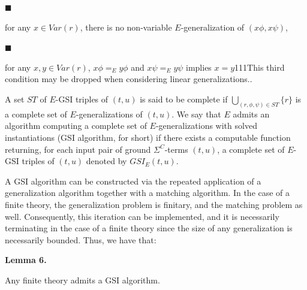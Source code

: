  
 
\par\noindent  $\blacksquare$ 
 
for any $x\in\mathit{Var}(r)$, there is no non-variable $E$-generalization of $(x\phi,x\psi)$,\par
 
 
 
\par\noindent  $\blacksquare$ 
 
for any $x,y\in\mathit{Var}(r)$, $x\phi=_{E}y\phi$ and $x\psi=_{E}y\psi$ implies $x=y$111This third condition may be dropped when considering linear generalizations..\par
 
 
  
A set $ST$ of $E$-GSI triples of $(t,u)$ is said to be complete if $\bigcup_{(r,\phi,\psi)\in ST}\{r\}$ is a complete set of $E$-generalizations of $(t,u)$. We say that $E$ admits an algorithm computing a complete set of $E$-generalizations with solved instantiations (GSI algorithm, for short) if there exists a computable function returning, for each input pair of ground ${\Sigma}^{C}$-terms $(t,u)$, a complete set of $E$-GSI triples of $(t,u)$ denoted by $GSI_{E}(t,u)$.\par
 
 
 
 
A GSI algorithm can be constructed via the repeated application of a generalization algorithm together with a matching algorithm. In the case of a finite theory, the generalization problem is finitary, and the matching problem as well. Consequently, this iteration can be implemented, and it is necessarily terminating in the case of a finite theory since the size of any generalization is necessarily bounded. Thus, we have that:\par
 
 
 
\par\medskip\noindent\textbf{Lemma 6.}\par
 
 
Any finite theory admits a GSI algorithm.\par
 

